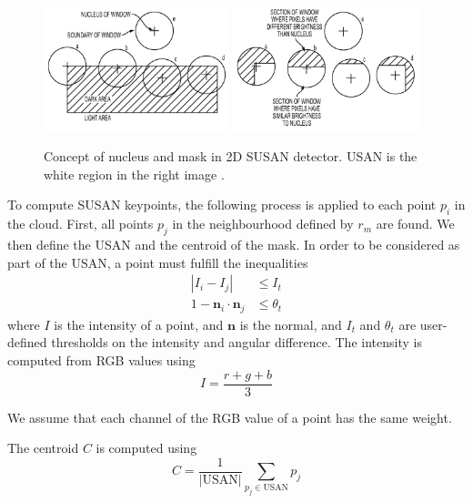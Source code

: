 \documentclass[11pt,a4paper]{kth-mag}
\begin{document}
\begin{figure}
  \centering
  \includegraphics[width=0.48\textwidth]{images/susan1}
  \includegraphics[width=0.48\textwidth]{images/susan}
  \caption{Concept of nucleus and mask in 2D SUSAN detector. USAN is the white
    region in the right image \cite{zhang2013susan}.}
  \label{fig:susan_nucleus}
\end{figure}

To compute SUSAN keypoints, the following process is applied to each point $p_i$
in the cloud. First, all points $p_j$ in the neighbourhood defined by $r_m$ are
found. We then define the USAN and the centroid of the mask. In order to be
considered as part of the USAN, a point must fulfill the inequalities
\begin{align}
  \label{eq:9}
  \left|I_i-I_j\right|&\leq I_t\\
  1-\mathbf{n}_i\cdot\mathbf{n}_j&\leq \theta_t
\end{align}
where $I$ is the intensity of a point, and $\mathbf{n}$ is the normal, and $I_t$
and $\theta_t$ are user-defined thresholds on the intensity and angular
difference. The intensity is computed from RGB values using
\begin{equation}
  \label{eq:10}
  I=\frac{r+g+b}{3}
\end{equation}

We assume that each channel of the RGB value of a point has the same weight.

The centroid $C$ is computed using
\begin{equation}
  \label{eq:11}
  C=\frac{1}{\left|\text{USAN}\right|}\sum_{p_j \in \text{USAN}}p_j
\end{equation}
\end{document}
